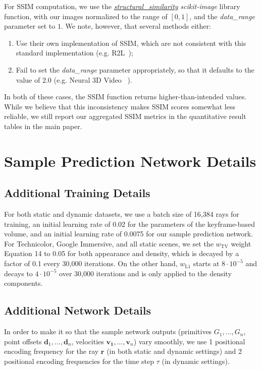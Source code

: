 \documentclass[10pt,twocolumn,letterpaper]{article}
\begin{document}
For SSIM computation, we use the \href{https://scikit-image.org/docs/stable/auto_examples/transform/plot_ssim.html}{\textit{structural\_similarity}} \textit{scikit-image} library function, with our images normalized to the range of $[0, 1]$, and the \textit{data\_range} parameter set to $1$. We note, however, that several methods either:

\begin{enumerate}
    \item Use their own implementation of SSIM, which are not consistent with this standard implementation (e.g. R2L~\cite{WangZLZZZWXY2022});
    \item Fail to set the \textit{data\_range} parameter appropriately, so that it defaults to the value of 2.0 (e.g. Neural 3D Video ~\cite{LiSZGLKSLGL2022}).
\end{enumerate}

In both of these cases, the SSIM function returns higher-than-intended values. While we believe that this inconsistency makes SSIM scores somewhat less reliable, we still report our aggregated SSIM metrics in the quantitative result tables in the main paper.



\section{Sample Prediction Network Details}
\label{sec:network_details}

\subsection{Additional Training Details}
For both static and dynamic datasets, we use a batch size of 16,384 rays for training, an initial learning rate of 0.02 for the parameters of the keyframe-based volume, and an initial learning rate of 0.0075 for our sample prediction network.
For Technicolor, Google Immersive, and all static scenes, we set the $w_\text{TV}$ weight Equation 14 to 0.05 for both appearance and density, which is decayed by a factor of 0.1 every 30,000 iterations.
On the other hand, $w_\text{L1}$ starts at $8 \!\cdot\! 10^{-5}$ and decays to $4 \!\cdot\! 10^{-5}$ over 30,000 iterations and is only applied to the density components.

\subsection{Additional Network Details}
In order to make it so that the sample network outputs (primitives $G_1, \dots, G_n$, point offsets $\mathbf{d}_1, \dots, \mathbf{d}_n$, velocities $\mathbf{v_1}, \dots, \mathbf{v}_n$) vary smoothly, we use 1 positional encoding frequency for the ray $\mathbf{r}$ (in both static and dynamic settings) and 2 positional encoding frequencies for the time step $\tau$ (in dynamic settings).
\end{document}
